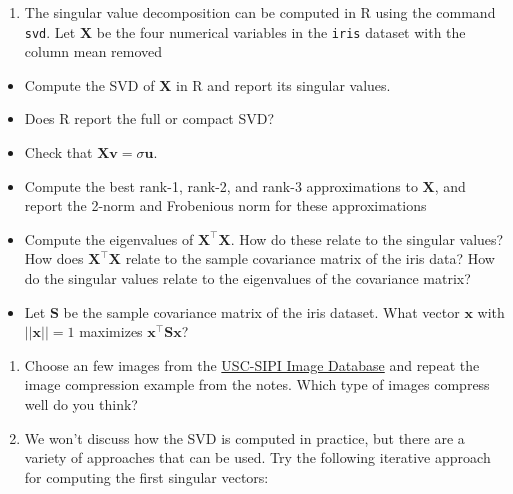 \documentclass[]{book}
\newenvironment{Shaded}{\begin{snugshade}}{\end{snugshade}}
\newcommand{\CommentTok}[1]{\textcolor[rgb]{0.56,0.35,0.01}{\textit{#1}}}
\newcommand{\DecValTok}[1]{\textcolor[rgb]{0.00,0.00,0.81}{#1}}
\newcommand{\KeywordTok}[1]{\textcolor[rgb]{0.13,0.29,0.53}{\textbf{#1}}}
\newcommand{\NormalTok}[1]{#1}
\newcommand{\OperatorTok}[1]{\textcolor[rgb]{0.81,0.36,0.00}{\textbf{#1}}}
\newcommand{\StringTok}[1]{\textcolor[rgb]{0.31,0.60,0.02}{#1}}
\providecommand{\tightlist}{%
  \setlength{\itemsep}{0pt}\setlength{\parskip}{0pt}}
\theoremstyle{definition}
\theoremstyle{definition}
\theoremstyle{definition}
\theoremstyle{remark}
\begin{document}
\begin{enumerate}
\def\labelenumi{\arabic{enumi}.}
\setcounter{enumi}{1}
\tightlist
\item
  The singular value decomposition can be computed in R using the command \texttt{svd}. Let \(\mathbf X\) be the four numerical variables in the \texttt{iris} dataset with the column mean removed
\end{enumerate}

\begin{Shaded}
\end{Shaded}

\begin{itemize}
\item
  Compute the SVD of \(\mathbf X\) in R and report its singular values.
\item
  Does R report the full or compact SVD?
\item
  Check that \(\mathbf X\mathbf v= \sigma \mathbf u\).
\item
  Compute the best rank-1, rank-2, and rank-3 approximations to \(\mathbf X\), and report the 2-norm and Frobenious norm for these approximations
\item
  Compute the eigenvalues of \(\mathbf X^\top \mathbf X\). How do these relate to the singular values? How does \(\mathbf X^\top \mathbf X\) relate to the sample covariance matrix of the iris data? How do the singular values relate to the eigenvalues of the covariance matrix?
\item
  Let \(\mathbf S\) be the sample covariance matrix of the iris dataset. What vector \(\mathbf x\) with \(||\mathbf x||=1\) maximizes \(\mathbf x^\top \mathbf S\mathbf x\)?
\end{itemize}

\begin{enumerate}
\def\labelenumi{\arabic{enumi}.}
\setcounter{enumi}{2}
\item
  Choose an few images from the \href{http://sipi.usc.edu/database/}{USC-SIPI Image Database} and repeat the image compression example from the notes. Which type of images compress well do you think?
\item
  We won't discuss how the SVD is computed in practice, but there are a variety of approaches that can be used. Try the following iterative approach for computing the first singular vectors:
\end{enumerate}
\end{document}
